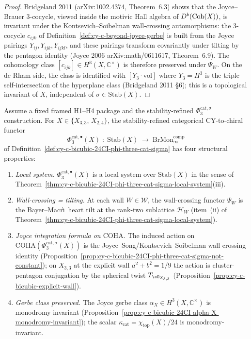 \begin{proof}
Bridgeland 2011 (arXiv:1002.4374, Theorem~6.3) shows that the
Joyce--Brauer 3-cocycle, viewed inside the motivic Hall algebra of
$D^b(\mathrm{Coh}(X))$, is invariant under the Kontsevich--Soibelman
wall-crossing automorphisms: the 3-cocycle $c_{ijk}$ of
Definition~\ref{def:cy-c-beyond-joyce-gerbe} is built from the Joyce
pairings $Y_{ij}, Y_{ijk}, Y_{ijkl}$, and these pairings transform
covariantly under tilting by the pentagon identity (Joyce 2006
arXiv:math/0611617, Theorem~6.9). The cohomology class
$[c_{ijk}] \in H^3(X, \mathbb C^\times)$ is therefore preserved under
$\Psi_W$. On the de Rham side, the class is identified with
$[Y_3 \cdot \mathrm{vol}]$ where $Y_3 = H^3$ is the triple
self-intersection of the hyperplane class (Bridgeland 2011 \S 6);
this is a topological invariant of $X$, independent of
$\sigma \in \mathrm{Stab}(X)$.
\end{proof}

\begin{theorem}
\label{thm:cy-c-bicubic-24CI-phi-three-cat-sigma-full}
Assume a fixed framed H1--H4 package and the stability-refined
$\Phi_3^{\mathrm{cat},\sigma}$ construction.
For $X \in \{X_{3,3},\, X_{2,4}\}$, the stability-refined categorical
CY-to-chiral functor
\[
 \Phi_3^{\mathrm{cat},\bullet}(X) \;:\;
 \mathrm{Stab}(X) \;\longrightarrow\;
 \mathrm{BrMon}^{\mathrm{comp}}_\infty
\]
of Definition~\ref{def:cy-c-bicubic-24CI-phi-three-cat-sigma} has
four structural properties:
\begin{enumerate}[label=\textup{(\roman*)}]
 \item \emph{Local system.} $\Phi_3^{\mathrm{cat},\bullet}(X)$ is a
 local system over $\mathrm{Stab}(X)$ in the sense of
 Theorem~\ref{thm:cy-c-bicubic-24CI-phi-three-cat-sigma-local-system}(iii).
 \item \emph{Wall-crossing = tilting.} At each wall
 $W \in \mathcal W$, the wall-crossing functor $\Psi_W$ is the
 Bayer--Macr\`\i\ heart tilt at the rank-two sublattice
 $\mathcal H_W$ (item~(ii) of
 Theorem~\ref{thm:cy-c-bicubic-24CI-phi-three-cat-sigma-local-system}).
 \item \emph{Joyce integration formula on $\mathrm{COHA}$.} The
 induced action on
 $\mathrm{COHA}(\Phi_3^{\mathrm{cat},\sigma}(X))$ is the
 Joyce--Song/Kontsevich--Soibelman wall-crossing identity
 (Proposition~\ref{prop:cy-c-bicubic-24CI-phi-three-cat-sigma-not-constant});
 on $X_{3,3}$ at the explicit wall
 $a^2 + b^2 = 1/9$ the action is cluster-pentagon conjugation
 by the spherical twist $T_{\cO_{X_{3,3}}}$
 (Proposition~\ref{prop:cy-c-bicubic-explicit-wall}).
 \item \emph{Gerbe class preserved.} The Joyce gerbe class
 $\alpha_X \in H^3(X, \mathbb C^\times)$ is monodromy-invariant
 (Proposition~\ref{prop:cy-c-bicubic-24CI-alpha-X-monodromy-invariant});
 the scalar $\kappa_{\mathrm{cat}} = \chi_{\mathrm{top}}(X)/24$
 is monodromy-invariant.
\end{enumerate}
\end{theorem}

